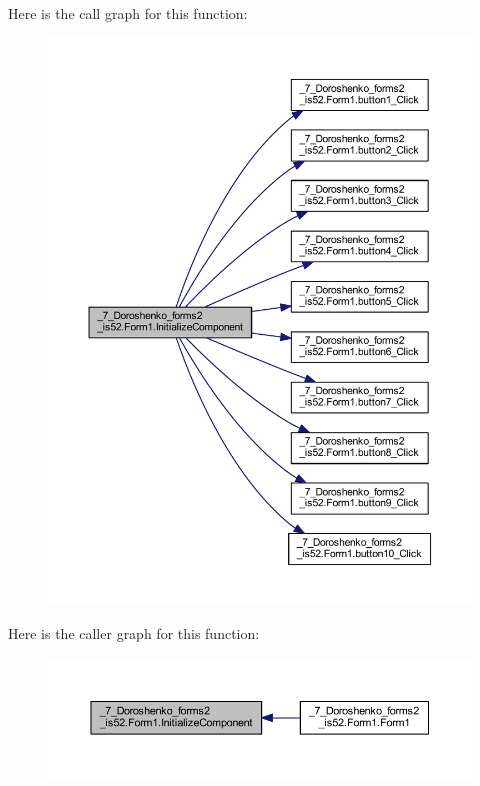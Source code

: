 Here is the call graph for this function\+:
\nopagebreak
\begin{figure}[H]
\begin{center}
\leavevmode
\includegraphics[width=350pt]{class__7___doroshenko__forms2__is52_1_1_form1_a5f037fdde44f5c3dff59d46faa2cb99f_cgraph}
\end{center}
\end{figure}
Here is the caller graph for this function\+:
\nopagebreak
\begin{figure}[H]
\begin{center}
\leavevmode
\includegraphics[width=350pt]{class__7___doroshenko__forms2__is52_1_1_form1_a5f037fdde44f5c3dff59d46faa2cb99f_icgraph}
\end{center}
\end{figure}


